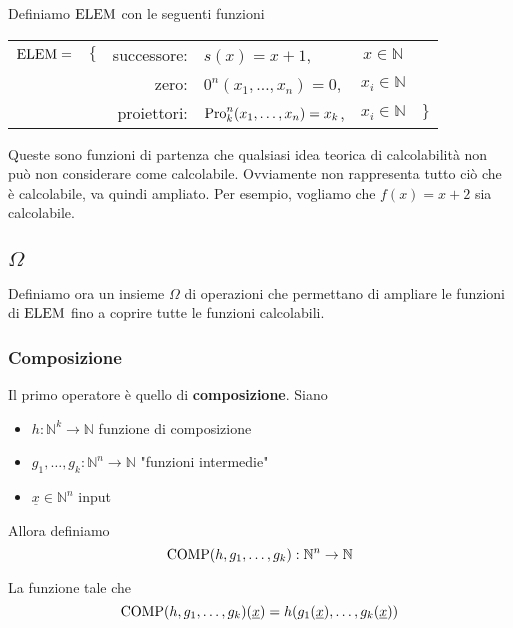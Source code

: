 Definiamo $\text{ELEM}$ con le seguenti funzioni
\begin{center}
	\begin{tabular}{r c r l c l}
		$\text{ELEM} = $ & $\{$ & successore: & $s(x) = x + 1$, & $x \in \mathbb{N}$ & \\
		&& zero: & $0^n (x_1, \dots, x_n) = 0$, & $x_i \in \mathbb{N}$ & \\
		&& proiettori: & $\text{Pro}_k^n (x_1, \dots, x_n) = x_k$, & $x_i \in \mathbb{N}$& $\}$ \\
	\end{tabular}
\end{center}

Queste sono funzioni di partenza che qualsiasi idea teorica di calcolabilità non può non considerare come calcolabile. Ovviamente non rappresenta tutto ciò che è calcolabile, va quindi ampliato. Per esempio, vogliamo che $f(x) = x+2$ sia calcolabile.

\subsection{$\Omega$}

Definiamo ora un insieme $\Omega$ di operazioni che permettano di ampliare le funzioni di $\text{ELEM}$ fino a coprire tutte le funzioni calcolabili.

\subsubsection{Composizione}

Il primo operatore è quello di \textbf{composizione}. Siano
\begin{itemize}
	\item $h: \mathbb{N}^k \rightarrow \mathbb{N}$ funzione di composizione

	\item $g_1, \dots, g_k: \mathbb{N}^n \rightarrow \mathbb{N}$ "funzioni intermedie"

	\item $\underline{x} \in \mathbb{N}^n$ input
\end{itemize}

Allora definiamo 
$$ \text{COMP} (h, g_1, \dots, g_k): \mathbb{N}^n \rightarrow \mathbb{N} $$

La funzione tale che
$$ \text{COMP} (h, g_1, \dots, g_k) (\underline{x}) = h(g_1(\underline{x}), \dots, g_k (\underline{x})) $$

\begin{center}
	
\end{center}

